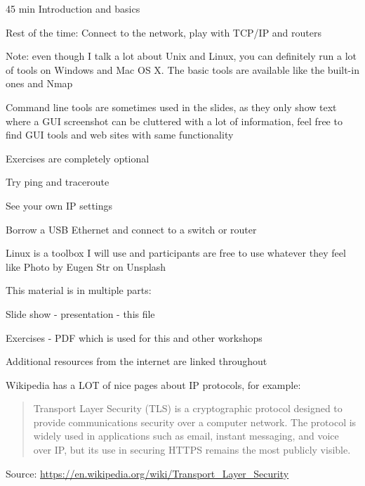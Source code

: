 \documentclass[Screen16to9,17pt]{foils}
\begin{document}

\begin{list2}
\item 45 min Introduction and basics

\item Rest of the time:
 Connect to the network, play with TCP/IP and routers
\end{list2}

Note: even though I talk a lot about Unix and Linux, you can definitely run a lot of tools on Windows and Mac OS X. The basic tools are available like the built-in ones and Nmap

Command line tools are sometimes used in the slides, as they only show text where a GUI screenshot can be cluttered with a lot of information, feel free to find GUI tools and web sites with same functionality


Exercises are completely optional

\begin{list2}
\item Try ping and traceroute
\item See your own IP settings
\item Borrow a USB Ethernet and connect to a switch or router
\end{list2}

Linux is a toolbox I will use and participants are free to use whatever they feel like
\hfill Photo by Eugen Str on Unsplash




\begin{list2}
\item This material is in multiple parts:

\item Slide show - presentation - this file
\item Exercises - PDF which is used for this and other workshops
\item Additional resources from the internet are linked throughout
\item Wikipedia has a LOT of nice pages about IP protocols, for example:
\end{list2}

\begin{quote}\small
Transport Layer Security (TLS) is a cryptographic protocol designed to provide communications security over a computer network. The protocol is widely used in applications such as email, instant messaging, and voice over IP, but its use in securing HTTPS remains the most publicly visible.
\end{quote}
Source: \url{https://en.wikipedia.org/wiki/Transport_Layer_Security}
\end{document}
